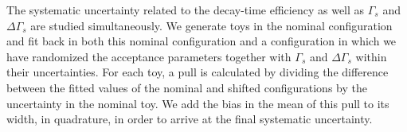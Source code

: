 
%
%



The systematic uncertainty related to the decay-time efficiency as well as
$\Gamma_s$ and $\Delta\Gamma_s$ are studied simultaneously.
We generate toys in the nominal configuration
and fit back in both this nominal configuration and a configuration in which we have
randomized the acceptance parameters together with $\Gamma_s$ and $\Delta\Gamma_s$ within their uncertainties.
For each toy, a pull is calculated by dividing the difference between the fitted values of the
nominal and shifted configurations by the uncertainty in the nominal toy. 
We add the bias in the mean of this pull to its width, in quadrature, in order to
arrive at the final systematic uncertainty.

